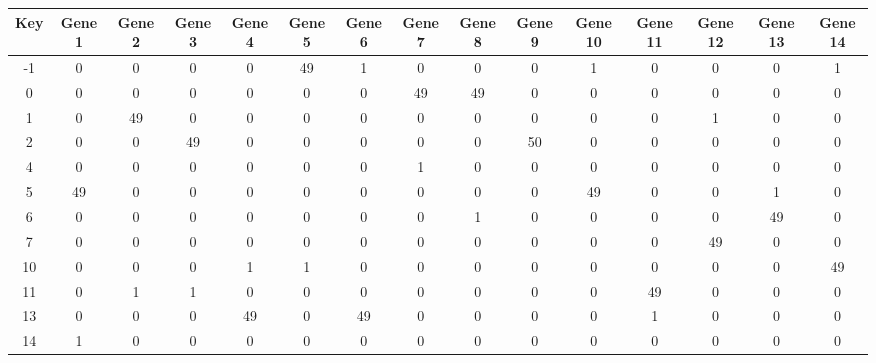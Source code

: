 \begin{tabular}{|c|c|c|c|c|c|c|c|c|c|c|c|c|c|c|}
\hline
Key & Gene 1 & Gene 2 & Gene 3 & Gene 4 & Gene 5 & Gene 6 & Gene 7 & Gene 8 & Gene 9 & Gene 10 & Gene 11 & Gene 12 & Gene 13 & Gene 14 \\
\hline
-1 & 0 & 0 & 0 & 0 & 49 & 1 & 0 & 0 & 0 & 1 & 0 & 0 & 0 & 1 \\
0 & 0 & 0 & 0 & 0 & 0 & 0 & 49 & 49 & 0 & 0 & 0 & 0 & 0 & 0 \\
1 & 0 & 49 & 0 & 0 & 0 & 0 & 0 & 0 & 0 & 0 & 0 & 1 & 0 & 0 \\
2 & 0 & 0 & 49 & 0 & 0 & 0 & 0 & 0 & 50 & 0 & 0 & 0 & 0 & 0 \\
4 & 0 & 0 & 0 & 0 & 0 & 0 & 1 & 0 & 0 & 0 & 0 & 0 & 0 & 0 \\
5 & 49 & 0 & 0 & 0 & 0 & 0 & 0 & 0 & 0 & 49 & 0 & 0 & 1 & 0 \\
6 & 0 & 0 & 0 & 0 & 0 & 0 & 0 & 1 & 0 & 0 & 0 & 0 & 49 & 0 \\
7 & 0 & 0 & 0 & 0 & 0 & 0 & 0 & 0 & 0 & 0 & 0 & 49 & 0 & 0 \\
10 & 0 & 0 & 0 & 1 & 1 & 0 & 0 & 0 & 0 & 0 & 0 & 0 & 0 & 49 \\
11 & 0 & 1 & 1 & 0 & 0 & 0 & 0 & 0 & 0 & 0 & 49 & 0 & 0 & 0 \\
13 & 0 & 0 & 0 & 49 & 0 & 49 & 0 & 0 & 0 & 0 & 1 & 0 & 0 & 0 \\
14 & 1 & 0 & 0 & 0 & 0 & 0 & 0 & 0 & 0 & 0 & 0 & 0 & 0 & 0 \\
\hline
\end{tabular}